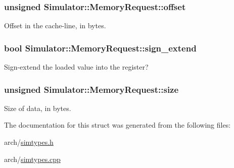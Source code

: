 \hypertarget{struct_simulator_1_1_memory_request_a2db3c5641196ad285fd9d45f74ec16eb}{
\subsubsection[{offset}]{\setlength{\rightskip}{0pt plus 5cm}unsigned Simulator\+::\+Memory\+Request\+::offset}}\label{struct_simulator_1_1_memory_request_a2db3c5641196ad285fd9d45f74ec16eb}


Offset in the cache-\/line, in bytes. 

\hypertarget{struct_simulator_1_1_memory_request_a555fcb4753e36b18ae39a73d01ea70a5}{
\subsubsection[{sign\+\_\+extend}]{\setlength{\rightskip}{0pt plus 5cm}bool Simulator\+::\+Memory\+Request\+::sign\+\_\+extend}}\label{struct_simulator_1_1_memory_request_a555fcb4753e36b18ae39a73d01ea70a5}


Sign-\/extend the loaded value into the register? 

\hypertarget{struct_simulator_1_1_memory_request_a2bd25f26857936a5a4b7c2080cc51132}{
\subsubsection[{size}]{\setlength{\rightskip}{0pt plus 5cm}unsigned Simulator\+::\+Memory\+Request\+::size}}\label{struct_simulator_1_1_memory_request_a2bd25f26857936a5a4b7c2080cc51132}


Size of data, in bytes. 



The documentation for this struct was generated from the following files\+:\begin{DoxyCompactItemize}
\item 
arch/\hyperlink{simtypes_8h}{simtypes.\+h}\item 
arch/\hyperlink{simtypes_8cpp}{simtypes.\+cpp}\end{DoxyCompactItemize}
